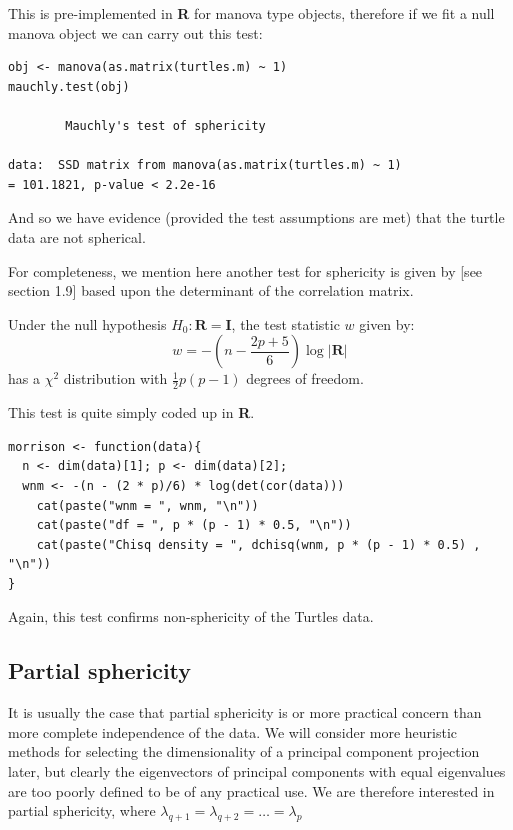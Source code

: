 This is pre-implemented in \textbf{R} for manova type objects, therefore if we fit a null manova object we can carry out this test:

\singlespacing
\begin{verbatim}
obj <- manova(as.matrix(turtles.m) ~ 1)
mauchly.test(obj)

        Mauchly's test of sphericity

data:  SSD matrix from manova(as.matrix(turtles.m) ~ 1) 
= 101.1821, p-value < 2.2e-16
\end{verbatim}
\onehalfspacing

And so we have evidence (provided the test assumptions are met) that the turtle data are not spherical.


For completeness, we mention here another test for sphericity is given by [see section 1.9] \cite{Morrison:2005} based upon the determinant of the correlation matrix.

\begin{definition}
\label{morrison}
Under the null hypothesis $H_{0}: \boldsymbol{R} = \boldsymbol{I}$, the test statistic $w$ given by:
\begin{displaymath}
w = -\left( n - \frac{2p + 5}{6} \right) \log \lvert \boldsymbol{R} \rvert
\end{displaymath}
has a $\chi^{2}$ distribution with $\frac{1}{2}p(p-1)$ degrees of freedom.
\end{definition}

This test is quite simply coded up in \textbf{R}.

\singlespacing
\begin{verbatim}
morrison <- function(data){
  n <- dim(data)[1]; p <- dim(data)[2];
  wnm <- -(n - (2 * p)/6) * log(det(cor(data)))
    cat(paste("wnm = ", wnm, "\n"))
    cat(paste("df = ", p * (p - 1) * 0.5, "\n"))
    cat(paste("Chisq density = ", dchisq(wnm, p * (p - 1) * 0.5) , "\n"))
}
\end{verbatim}
\onehalfspacing

Again, this test confirms non-sphericity of the Turtles data.

\subsection{Partial sphericity}

It is usually the case that partial sphericity is or more practical concern than more complete independence of the data.   We will consider more heuristic methods for selecting the dimensionality of a principal component projection later, but clearly the eigenvectors of principal components with equal eigenvalues are too poorly defined to be of any practical use.   We are therefore interested in partial sphericity, where $\lambda_{q+1} = \lambda_{q+2} = \ldots = \lambda_{p}$

